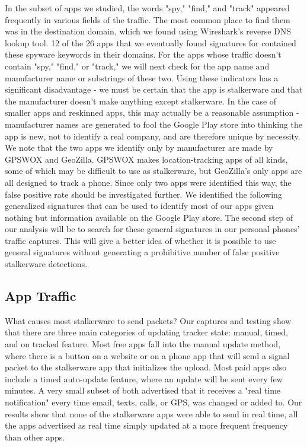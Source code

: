 \documentclass[acmtog]{acmart}
\begin{document}
In the subset of apps we studied, the words "spy," "find," and "track" appeared 
frequently in various fields of the traffic. The most common place to find them 
was in the destination domain, which we found using Wireshark's reverse DNS 
lookup tool. 12 of the 26 apps that we eventually found signatures for 
contained these spyware keywords in their domains. 
For the apps whose traffic doesn't contain "spy," "find," or "track," we will 
next check for the app name and manufacturer name or substrings of these two. 
Using these indicators has a significant disadvantage - we must be certain that 
the app is stalkerware and that the manufacturer doesn't make anything except 
stalkerware. In the case of smaller apps and reskinned apps, this may actually 
be a reasonable assumption - manufacturer names are generated to fool the 
Google Play store into thinking the app is new, not to identify a real company, 
and are therefore unique by necessity. We note that the two apps we identify 
only by manufacturer are made by GPSWOX and GeoZilla. GPSWOX makes 
location-tracking apps of all kinds, some of which may be difficult to use as 
stalkerware, but GeoZilla's only apps are all designed to track a phone. Since 
only two apps were identified this way, the false positive rate should be 
investigated further.
We identified the following generalized signatures that can be used to identify 
most of our apps given nothing but information available on the Google Play 
store. The second step of our analysis will be to search for these general 
signatures in our personal phones' traffic captures. This will give a better 
idea of whether it is possible to use general signatures without generating a 
prohibitive number of false positive stalkerware detections.


\subsection{App Traffic}

What causes most stalkerware to send packets? Our captures and testing show 
that there are three main categories of updating tracker state: manual, timed, 
and on tracked feature. Most free apps fall into the manual update method, 
where there is a button on a website or on a phone app that will send a signal 
packet to the stalkerware app that initializes the upload. Most paid apps also 
include a timed auto-update feature, where an update will be sent every few 
minutes. A very small subset of both advertised that it receives a "real time 
notification" every time email, texts, calls, or GPS, was changed or added to. 
Our results show that none of the stalkerware apps were able to send in real 
time, all the apps advertised as real time simply updated at a more frequent 
frequency than other apps.
\end{document}
